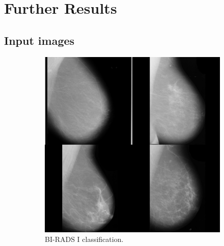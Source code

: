 \chapter{Further Results}
\label{appendix:results}

\section{Input images}

\begin{figure}[H]
    \centering
    \begin{subfigure}[t]{0.3\textwidth}
        \includegraphics[width=\textwidth]{Appendix5/sample1/big_scan.png}
        \caption{BI-RADS I classification.}
        \label{fig:app-sample1-input}
    \end{subfigure}
    ~ %
    \begin{subfigure}[t]{0.3\textwidth}

\end{subfigure}
\end{figure}
